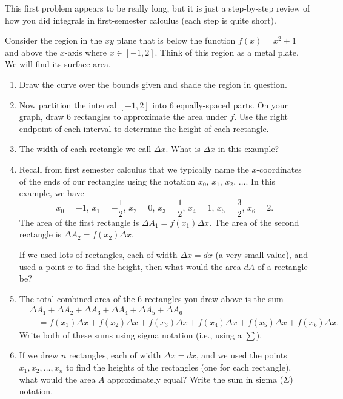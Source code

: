 This first problem appears to be really long, but it is just a step-by-step review of how you did integrals in first-semester calculus (each step is quite short).
\begin{problem}
 Consider the region in the $xy$ plane that is below the function $f(x)=x^2+1$ and above the $x$-axis where $x\in[-1,2]$.  Think of this region as a metal plate.  We will find its surface area.
\begin{enumerate}
 \item Draw the curve over the bounds given and shade the region in question. 
 \item  {}%
 Now partition the interval $[-1,2]$ into 6 equally-spaced parts. On your graph, draw 6 rectangles  to approximate the area under $f$.  Use the right endpoint of each interval to determine the height of each rectangle.
 \item The width of each rectangle we call $\Delta x$. What is $\Delta x$ in this example?
 \item Recall from first semester calculus that we typically name the $x$-coordinates of the ends of our rectangles using the notation $x_0$, $x_1$, $x_2$, $\ldots$. In this example, we have 
$$
x_0=-1,\, 
x_1=-\frac{1}{2}, \, 
x_2=0, \, 
x_3=\frac{1}{2}, \, 
x_4=1, \, 
x_5=\frac{3}{2}, \, 
x_6=2.
$$
The area of the first rectangle is $\Delta A_1=f(x_1)\Delta x$. The area of the second rectangle is $\Delta A_2= f(x_2)\Delta x$. 

If we used lots of rectangles, each of width $\Delta x = dx$ (a very small value), and used a point $x$ to find the height, then what would the area $dA$ of a rectangle be?

\item 
The total combined area of the 6 rectangles you drew above is the sum
\begin{equation*}
\begin{split}
&\Delta A_1+\Delta A_2+\Delta A_3+\Delta A_4+\Delta A_5+\Delta A_6 \\
&\quad =f(x_1)\Delta x+
f(x_2)\Delta x+
f(x_3)\Delta x+
f(x_4)\Delta x+
f(x_5)\Delta x+
f(x_6)\Delta x.
\end{split}
\end{equation*}
Write both of these sums using sigma notation (i.e., using a $\sum$). 

\item If we drew $n$ rectangles, each of width $\Delta x=dx$, and we used the points $x_1,x_2,\ldots,x_n$ to find the heights of the rectangles (one for each rectangle), what would the area $A$ approximately equal?  Write the sum in sigma ($\Sigma$) notation.


\end{enumerate}
\end{problem}
